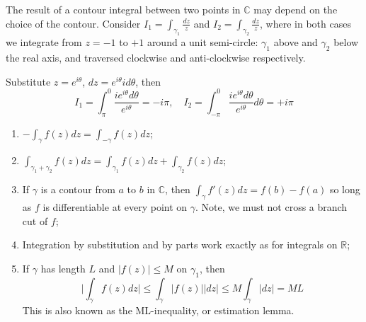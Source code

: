 \documentclass[a4paper]{article}
\begin{document}
\begin{eg}
The result of a contour integral between two points in $\mathbb{C}$ may depend on the choice of the contour. Consider $I_1=\int_{\gamma_1}\frac{dz}{z}$ and $I_2=\int_{\gamma_2}\frac{dz}{z}$, where in both cases we integrate from $z=-1$ to $+1$ around a unit semi-circle: $\gamma_1$ above and $\gamma_2$ below the real axis, and traversed clockwise and anti-clockwise respectively.
  \begin{center}
  \end{center}
  Substitute $z=e^{i\theta}$, $dz=e^{i\theta}id\theta$, then 
  $$I_1=\int_{\pi}^0\frac{ie^{i\theta}d\theta}{e^{i\theta}}=-i\pi,\quad I_2=\int_{-\pi}^0\frac{ie^{i\theta}d\theta}{e^{i\theta}}d\theta=+i\pi$$
\end{eg}
\begin{prop}\leavevmode
\begin{enumerate}
    \item $-\int_\gamma f(z)dz=\int_{-\gamma}f(z)dz$;
    \item $\int_{\gamma_1+\gamma_2}f(z)dz=\int_{\gamma_1}f(z)dz+\int_{\gamma_2}f(z)dz$;
    \item If $\gamma$ is a contour from $a$ to $b$ in $\mathbb{C}$, then $\int_\gamma f'(z)dz=f(b)-f(a)$ so long as $f$ is differentiable at every point on $\gamma$. Note, we must not cross a branch cut of $f$;
    \item Integration by substitution and by parts work exactly as for integrals on $\mathbb{R}$;
    \item If $\gamma$ has length $L$ and $|f(z)|\leq M$ on $\gamma_1$, then 
    $$\bigg|\int_\gamma f(z)dz\bigg|\leq\int_\gamma|f(z)||dz|\leq M\int_\gamma |dz|=ML$$
    This is also known as the ML-inequality, or estimation lemma.
\end{enumerate}
\end{prop}
\end{document}
